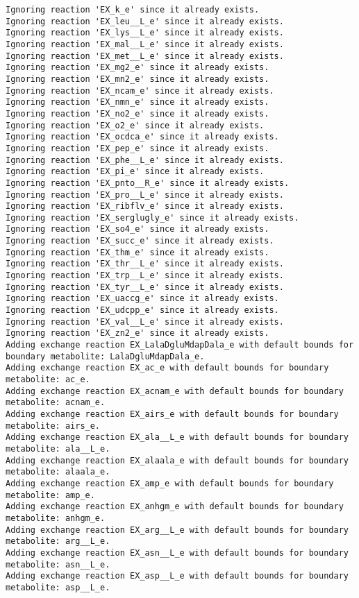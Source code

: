 \documentclass[
  letterpaper,
  DIV=11,
  numbers=noendperiod]{scrartcl}
\begin{document}
\begin{verbatim}
Ignoring reaction 'EX_k_e' since it already exists.
Ignoring reaction 'EX_leu__L_e' since it already exists.
Ignoring reaction 'EX_lys__L_e' since it already exists.
Ignoring reaction 'EX_mal__L_e' since it already exists.
Ignoring reaction 'EX_met__L_e' since it already exists.
Ignoring reaction 'EX_mg2_e' since it already exists.
Ignoring reaction 'EX_mn2_e' since it already exists.
Ignoring reaction 'EX_ncam_e' since it already exists.
Ignoring reaction 'EX_nmn_e' since it already exists.
Ignoring reaction 'EX_no2_e' since it already exists.
Ignoring reaction 'EX_o2_e' since it already exists.
Ignoring reaction 'EX_ocdca_e' since it already exists.
Ignoring reaction 'EX_pep_e' since it already exists.
Ignoring reaction 'EX_phe__L_e' since it already exists.
Ignoring reaction 'EX_pi_e' since it already exists.
Ignoring reaction 'EX_pnto__R_e' since it already exists.
Ignoring reaction 'EX_pro__L_e' since it already exists.
Ignoring reaction 'EX_ribflv_e' since it already exists.
Ignoring reaction 'EX_serglugly_e' since it already exists.
Ignoring reaction 'EX_so4_e' since it already exists.
Ignoring reaction 'EX_succ_e' since it already exists.
Ignoring reaction 'EX_thm_e' since it already exists.
Ignoring reaction 'EX_thr__L_e' since it already exists.
Ignoring reaction 'EX_trp__L_e' since it already exists.
Ignoring reaction 'EX_tyr__L_e' since it already exists.
Ignoring reaction 'EX_uaccg_e' since it already exists.
Ignoring reaction 'EX_udcpp_e' since it already exists.
Ignoring reaction 'EX_val__L_e' since it already exists.
Ignoring reaction 'EX_zn2_e' since it already exists.
Adding exchange reaction EX_LalaDgluMdapDala_e with default bounds for boundary metabolite: LalaDgluMdapDala_e.
Adding exchange reaction EX_ac_e with default bounds for boundary metabolite: ac_e.
Adding exchange reaction EX_acnam_e with default bounds for boundary metabolite: acnam_e.
Adding exchange reaction EX_airs_e with default bounds for boundary metabolite: airs_e.
Adding exchange reaction EX_ala__L_e with default bounds for boundary metabolite: ala__L_e.
Adding exchange reaction EX_alaala_e with default bounds for boundary metabolite: alaala_e.
Adding exchange reaction EX_amp_e with default bounds for boundary metabolite: amp_e.
Adding exchange reaction EX_anhgm_e with default bounds for boundary metabolite: anhgm_e.
Adding exchange reaction EX_arg__L_e with default bounds for boundary metabolite: arg__L_e.
Adding exchange reaction EX_asn__L_e with default bounds for boundary metabolite: asn__L_e.
Adding exchange reaction EX_asp__L_e with default bounds for boundary metabolite: asp__L_e.

\end{verbatim}
\end{document}
